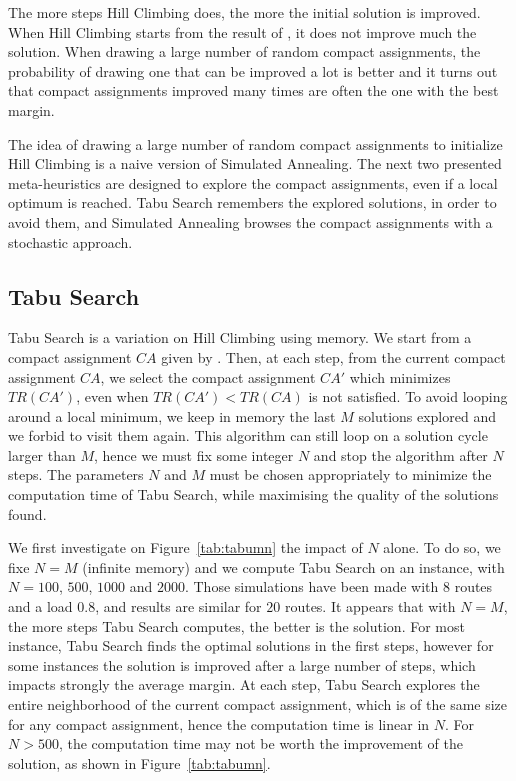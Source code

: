  The more steps Hill Climbing does, the more the initial solution is improved. When Hill Climbing starts from the result of \hybridgreedynormalized, it does not improve much the solution. When drawing a large number of random compact assignments, the probability of drawing one that can be improved a lot is better and it turns out that compact assignments improved many times are often the one with the best margin.
 
 The idea of drawing a large number of random compact assignments to initialize Hill Climbing is a naive version of Simulated Annealing. The next two presented meta-heuristics are designed to explore the compact assignments, even if a local optimum is reached. Tabu Search remembers the explored solutions, in order to avoid them, and Simulated Annealing browses the compact assignments with a stochastic approach.

\subsection{Tabu Search}

Tabu Search is a variation on Hill Climbing using memory. We start from a compact assignment $CA$ given by \hybridgreedynormalized. Then, at each step, from the current compact assignment $CA$, we select the compact assignment $CA'$ which minimizes $TR(CA')$, even when $TR(CA') < TR(CA)$ is not satisfied. To avoid looping around a local minimum, we keep in memory the last $M$ solutions explored and we forbid to visit them again. This algorithm can still loop on a solution cycle larger than $M$, hence we must fix some integer $N$ and stop the algorithm after $N$ steps.
The parameters $N$ and $M$ must be chosen appropriately to minimize the computation time of Tabu Search, while maximising the quality of the solutions found. 

We first investigate on Figure~\ref{tab:tabumn} the impact of $N$ alone. To do so, we fixe $N = M$ (infinite memory) and we compute  Tabu Search on an instance, with $N = 100$, $500$, $1000$ and $2000$. Those simulations have been made with $8$ routes and a load $0.8$, and results are similar for $20$ routes. It appears that with $N=M$, the more steps Tabu Search computes, the better is the solution. For most instance, Tabu Search finds the optimal solutions in the first steps, however for some instances the solution is improved after a large number of steps, which impacts strongly the average margin. At each step, Tabu Search explores the entire neighborhood of the current compact assignment,
which is of the same size for any compact assignment, hence the computation time is linear in $N$. For $N > 500$, the computation time may not be worth the improvement of the solution, as shown in Figure~\ref{tab:tabumn}.



